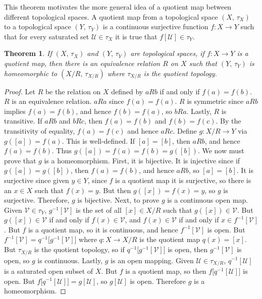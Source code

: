 \documentclass{article}
\theoremstyle{plain}
\newtheorem{theorem}{Theorem}[section]
\theoremstyle{normal}
\newenvironment{definition}{%
    \pushQED{\qed}\renewcommand{\qedsymbol}{$\blacksquare$}\definitionx%
}{%
    \popQED\enddefinitionx%
}
\begin{document}
        This theorem motivates the more general idea of a quotient map between
        different topological spaces.
        \begin{definition}[\textbf{Quotient Map}]
            A quotient map from a topological space $(X,\,\tau_{X})$ to a
            topological space $(Y,\,\tau_{Y})$ is a continuous surjective
            function $f:X\rightarrow{Y}$ such that for every saturated
            set $\mathcal{U}\in\tau_{X}$ it is true that
            $f[\mathcal{U}]\in\tau_{Y}$.
        \end{definition}
        \begin{theorem}
            If $(X,\,\tau_{X})$ and $(Y,\,\tau_{Y})$ are topological spaces,
            if $f:X\rightarrow{Y}$ is a quotient map, then there is an
            equivalence relation $R$ on $X$ such that $(Y,\,\tau_{Y})$ is
            homeomorphic to $(X/R,\,\tau_{X/R})$ where $\tau_{X/R}$ is the
            quotient topology.
        \end{theorem}
        \begin{proof}
            Let $R$ be the relation on $X$ defined by $aRb$ if and only if
            $f(a)=f(b)$. $R$ is an equivalence relation. $aRa$ since
            $f(a)=f(a)$. $R$ is symmetric since $aRb$ implies $f(a)=f(b)$,
            and hence $f(b)=f(a)$, so $bRa$. Lastly, $R$ is transitive. If
            $aRb$ and $bRc$, then $f(a)=f(b)$ and $f(b)=f(c)$. By the
            transitivity of equality, $f(a)=f(c)$ and hence $aRc$.
            Define $g:X/R\rightarrow{Y}$ via $g([a])=f(a)$. This is
            well-defined. If $[a]=[b]$, then $aRb$, and hence $f(a)=f(b)$. Thus
            $g([a])=f(a)=f(b)=g([b])$. We now must prove that $g$ is a
            homeomorphism. First, it is bijective. It is injective since if
            $g([a])=g([b])$, then $f(a)=f(b)$, and hence $aRb$, so $[a]=[b]$.
            It is surjective since given $y\in{Y}$, since $f$ is a quotient map
            it is surjective, so there is an $x\in{X}$ such that $f(x)=y$. But
            then $g([x])=f(x)=y$, so $g$ is surjective. Therefore, $g$ is
            bijective. Next, to prove $g$ is a continuous open map. Given
            $\mathcal{V}\in\tau_{Y}$, $g^{-1}[\mathcal{V}]$ is the set of
            all $[x]\in{X}/R$ such that $g([x])\in\mathcal{V}$. But
            $g([x])\in\mathcal{V}$ if and only if $f(x)\in\mathcal{V}$, and
            $f(x)\in\mathcal{V}$ if and only if $x\in{f}^{-1}[\mathcal{V}]$. But
            $f$ is a quotient map, so it is continuous, and hence
            $f^{-1}[\mathcal{V}]$ is open. But
            $f^{-1}[\mathcal{V}]=q^{-1}\big[g^{-1}[\mathcal{V}]\big]$ where
            $q:X\rightarrow{X}/R$ is the quotient map $q(x)=[x]$. But
            $\tau_{X/R}$ is the quotient topology, so if
            $q^{-1}\big[g^{-1}[\mathcal{V}]\big]$ is open, then
            $g^{-1}[\mathcal{V}]$ is open, so $g$ is continuous. Lastly,
            $g$ is an open mapping. Given $\mathcal{U}\in\tau_{X/R}$,
            $q^{-1}[\mathcal{U}]$ is a saturated open subset of $X$. But $f$ is
            a quotient map, so then $f\big[q^{-1}[\mathcal{U}]\big]$ is open.
            But $f\big[q^{-1}[\mathcal{U}]\big]=g[\mathcal{U}]$, so
            $g[\mathcal{U}]$ is open. Therefore $g$ is a homeomorphism.
        \end{proof}
\end{document}
